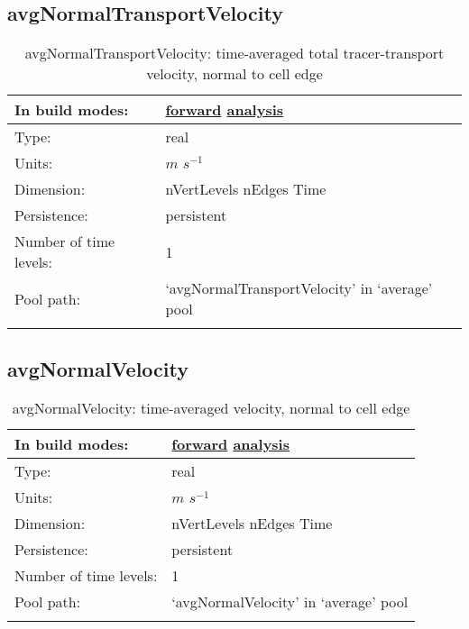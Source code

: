 \subsection[avgNormalTransportVelocity]{avgNormalTransportVelocity}
\label{subsec:var_sec_average_avgNormalTransportVelocity}
\begin{center}
\begin{longtable}{| p{2.0in} | p{4.0in} |}
        \hline 
        In build modes: & \hyperref[subsec:forward_var_tab_average]{forward} \hyperref[subsec:analysis_var_tab_average]{analysis} \\
        \hline 
        Type: & real \\
        \hline 
        Units: & $m$ $s^{-1}$ \\
        \hline 
        Dimension: & nVertLevels nEdges Time \\
        \hline 
        Persistence: & persistent \\
        \hline 
        Number of time levels: & 1 \\
        \hline 
            Pool path: & `avgNormalTransportVelocity' in `average' pool \\
		 \hline 
    \caption{avgNormalTransportVelocity: time-averaged total tracer-transport velocity, normal to cell edge}
\end{longtable}
\end{center}
\subsection[avgNormalVelocity]{avgNormalVelocity}
\label{subsec:var_sec_average_avgNormalVelocity}
\begin{center}
\begin{longtable}{| p{2.0in} | p{4.0in} |}
        \hline 
        In build modes: & \hyperref[subsec:forward_var_tab_average]{forward} \hyperref[subsec:analysis_var_tab_average]{analysis} \\
        \hline 
        Type: & real \\
        \hline 
        Units: & $m$ $s^{-1}$ \\
        \hline 
        Dimension: & nVertLevels nEdges Time \\
        \hline 
        Persistence: & persistent \\
        \hline 
        Number of time levels: & 1 \\
        \hline 
            Pool path: & `avgNormalVelocity' in `average' pool \\
		 \hline 
    \caption{avgNormalVelocity: time-averaged velocity, normal to cell edge}
\end{longtable}
\end{center}
